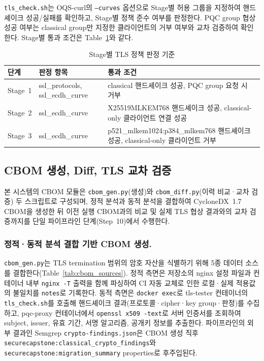 \texttt{tls\_check.sh}는 OQS-curl의 \texttt{--curves} 옵션으로 Stage별 허용 그룹을 지정하여 핸드셰이크 성공/실패를 확인하고, Stage별 정책 준수 여부를 판정한다.
PQC group 협상 성공 여부는 classical group만 지정한 클라이언트의 거부 여부와 교차 검증하여 확인한다.
Stage별 통과 조건은 Table~\ref{tab:tls_policy}와 같다.

\begin{table}[htbp]
\centering
\renewcommand{\arraystretch}{1.3}
\caption{Stage별 TLS 정책 판정 기준}
\label{tab:tls_policy}
\begin{tabular}{p{2.5cm}p{3.5cm}p{6cm}}
\toprule
단계 & 판정 항목 & 통과 조건 \\
\midrule
Stage~1 & ssl\_protocols, \newline ssl\_ecdh\_curve & classical 핸드셰이크 성공, PQC group 요청 시 거부 \\
Stage~2 & ssl\_ecdh\_curve & X25519MLKEM768 핸드셰이크 성공, classical-only 클라이언트 연결 성공 \\
Stage~3 & ssl\_ecdh\_curve & p521\_mlkem1024:p384\_mlkem768 핸드셰이크 성공, classical-only 클라이언트 거부 \\
\bottomrule
\end{tabular}
\end{table}

\subsection{CBOM 생성, Diff, TLS 교차 검증}
\label{sec:cbom}

본 시스템의 CBOM 모듈은 \texttt{cbom\_gen.py}(생성)와 \texttt{cbom\_diff.py}(이력 비교·교차 검증) 두 스크립트로 구성되며, 정적 분석과 동적 분석을 결합하여 CycloneDX~1.7 CBOM을 생성한 뒤 이전 실행 CBOM과의 비교 및 실제 TLS 협상 결과와의 교차 검증까지를 단일 파이프라인 단계(Step~10)에서 수행한다.

\subsubsection{정적·동적 분석 결합 기반 CBOM 생성.}

\texttt{cbom\_gen.py}는 TLS termination 범위의 암호 자산을 식별하기 위해 5종 데이터 소스를 결합한다(Table~\ref{tab:cbom_sources}).
정적 측면은 저장소의 nginx 설정 파일과 컨테이너 내부 \texttt{nginx -T} 출력을 함께 파싱하여 CI 자동 교체로 인한 로컬·실제 적용값의 불일치를 \texttt{notes}로 기록한다.
동적 측면은 \texttt{docker exec}로 tls-tester 컨테이너의 \texttt{tls\_check.sh}를 호출해 핸드셰이크 결과(프로토콜·cipher·key group·판정)를 수집하고, pqc-proxy 컨테이너에서 \texttt{openssl x509 -text}로 서버 인증서를 조회하여 subject, issuer, 유효 기간, 서명 알고리즘, 공개키 정보를 추출한다.
파이프라인의 외부 결과인 Semgrep \texttt{crypto-findings.json}은 CBOM 생성 직후 \texttt{securecapstone:classical\_crypto\_findings}와 \texttt{securecapstone:migration\_summary} properties로 후주입된다.

